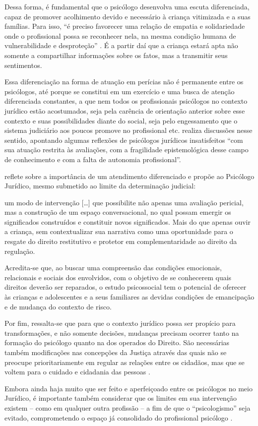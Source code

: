 Dessa forma, é fundamental que o psicólogo desenvolva uma escuta diferenciada, capaz de promover acolhimento devido e necessário à criança vitimizada e a suas famílias. Para isso, ``é preciso favorecer uma relação de empatia e solidariedade onde o profissional possa se reconhecer nela, na mesma condição humana de vulnerabilidade e desproteção'' \cite[p. 25]{SANTOS2009}. É a partir daí que a criança estará apta não somente a compartilhar informações sobre os fatos, mas a transmitir seus sentimentos. 

Essa diferenciação na forma de atuação em perícias não é permanente entre os psicólogos, até porque se constitui em um exercício e uma busca de atenção diferenciada constantes, a que nem todos os profissionais psicólogos no contexto jurídico estão acostumados, seja pela carência de orientação anterior sobre esse contexto e suas possibilidades diante do social, seja pelo engessamento que o sistema judiciário aos poucos promove no profissional etc.  realiza discussões nesse sentido, apontando algumas reflexões de psicólogos jurídicos insatisfeitos ``com sua atuação restrita às avaliações, com a fragilidade epistemológica desse campo de conhecimento e com a falta de autonomia profissional''.

 reflete sobre a importância de um atendimento diferenciado e propõe ao Psicólogo Jurídico, mesmo submetido ao limite da determinação judicial:

\begin{citacao}
	um modo de intervenção [\ldots] que possibilite não apenas uma avaliação pericial, mas a construção de um espaço conversacional, no qual possam emergir os significados construídos e constituir novos significados. Mais do que apenas ouvir a criança, sem contextualizar sua narrativa como uma oportunidade para o resgate do direito restitutivo e protetor em complementaridade ao direito da regulação. 

	Acredita-se que, ao buscar uma compreensão das condições emocionais, relacionais e sociais dos envolvidos, com o objetivo de se conhecerem quais direitos deverão ser reparados, o estudo psicossocial tem o potencial de oferecer às crianças e adolescentes e a seus familiares as devidas condições de emancipação e de mudança do contexto de risco.
\end{citacao}

Por fim, ressalta-se que para que o contexto jurídico possa ser propício para transformações, e não somente decisões, mudanças precisam ocorrer tanto na formação do psicólogo quanto na dos operados do Direito. São necessárias também modificações nas concepções da Justiça através das quais não se preocupe prioritariamente em regular as relações entre os cidadãos, mas que se voltem para o cuidado e cidadania das pessoas \cite{COSTA2009}. 

Embora ainda haja muito que ser feito e aperfeiçoado entre os psicólogos no meio Jurídico, é importante também considerar que os limites em sua intervenção existem -- como em qualquer outra profissão -- a fim de que o ``psicologismo'' seja evitado, comprometendo o espaço já consolidado do profissional psicólogo \cite[p. 34]{JESUS2001}.